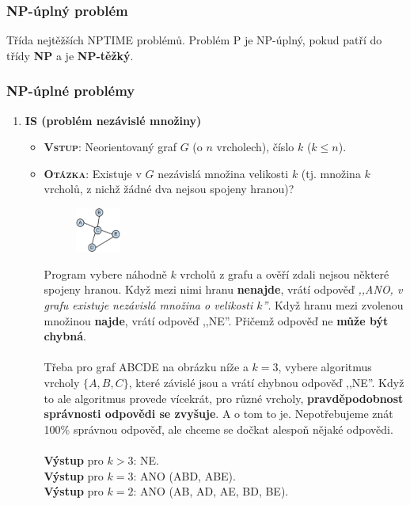 \subsubsection{NP-úplný problém}
Třída nejtěžších NPTIME problémů. Problém P je NP-úplný, pokud patří do třídy \textbf{NP} a je \textbf{NP-těžký}.

\subsubsection{NP-úplné problémy}

\begin{enumerate}
	\item \textbf{IS (problém nezávislé množiny)}
	\begin{itemize}
		\item \textbf{\textsc{Vstup}}: Neorientovaný graf $G$ (o $n$ vrcholech), číslo $k$ ($k \leq n$).
		\item \textbf{\textsc{Otázka}}: Existuje v $G$ nezávislá množina velikosti $k$ (tj. množina $k$ vrcholů, z nichž žádné dva nejsou spojeny hranou)?
		\begin{figure}[H]
			\centering
			\includegraphics[width=0.15\textwidth]{assets/problem_is}
		\end{figure}
		Program vybere náhodně $k$ vrcholů z grafu a ověří zdali nejsou některé spojeny hranou. Když mezi nimi hranu \textbf{nenajde}, vrátí odpověď \textit{,,ANO, v grafu existuje nezávislá množina o velikosti $k$''}. Když hranu mezi zvolenou množinou \textbf{najde}, vrátí odpověď ,,NE''. Přičemž odpověď ne \textbf{může být chybná}. 
		\\\\
		Třeba pro graf ABCDE na obrázku níže a $k = 3$, vybere algoritmus vrcholy $\{A, B, C\}$, které závislé jsou a vrátí chybnou odpověď ,,NE''. Když to ale algoritmus provede vícekrát, pro různé vrcholy, \textbf{pravděpodobnost správnosti odpovědi se zvyšuje}. A o tom to je. Nepotřebujeme znát 100\% správnou odpověď, ale chceme se dočkat alespoň nějaké odpovědi.
		\\\\
		\textbf{Výstup} pro $k > 3$: NE.
\\
		\textbf{Výstup} pro $k = 3$: ANO (ABD, ABE).
\\
		\textbf{Výstup} pro $k = 2$: ANO (AB, AD, AE, BD, BE).

\end{itemize}
\end{enumerate}
